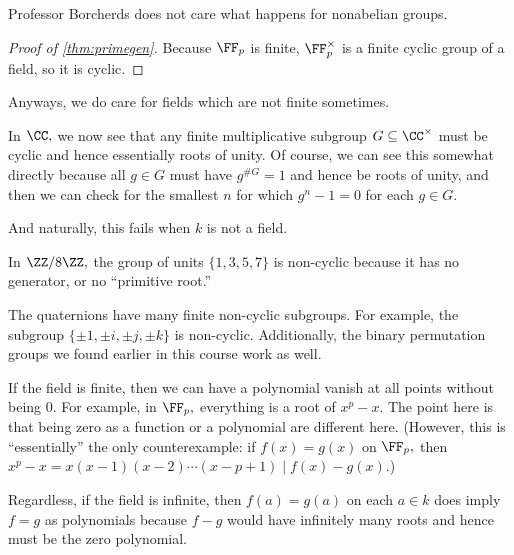 \begin{remark}
	Professor Borcherds does not care what happens for nonabelian groups.
\end{remark}
\begin{proof}[Proof of \autoref{thm:primegen}]
	Because $\FF_p$ is finite, $\FF_p^\times$ is a finite cyclic group of a field, so it is cyclic.
\end{proof}
Anyways, we do care for fields which are not finite sometimes.
\begin{example}
	In $\CC,$ we now see that any finite multiplicative subgroup $G\subseteq\CC^\times$ must be cyclic and hence essentially roots of unity. Of course, we can see this somewhat directly because all $g\in G$ must have $g^{\#G}=1$ and hence be roots of unity, and then we can check for the smallest $n$ for which $g^n-1=0$ for each $g\in G.$
\end{example}
And naturally, this fails when $k$ is not a field.
\begin{nex}
	In $\ZZ/8\ZZ,$ the group of units $\{1,3,5,7\}$ is non-cyclic because it has no generator, or no ``primitive root.''
\end{nex}
\begin{nex}
	The quaternions have many finite non-cyclic subgroups. For example, the subgroup $\{\pm1,\pm i,\pm j,\pm k\}$ is non-cyclic. Additionally, the binary permutation groups we found earlier in this course work as well.
\end{nex}
\begin{remark}
	If the field is finite, then we can have a polynomial vanish at all points without being $0.$ For example, in $\FF_p,$ everything is a root of $x^p-x.$ The point here is that being zero as a function or a polynomial are different here. (However, this is ``essentially'' the only counterexample: if $f(x)=g(x)$ on $\FF_p,$ then $x^p-x=x(x-1)(x-2)\cdots(x-p+1)\mid f(x)-g(x).$)
\end{remark}
Regardless, if the field is infinite, then $f(a)=g(a)$ on each $a\in k$ does imply $f=g$ as polynomials because $f-g$ would have infinitely many roots and hence must be the zero polynomial.

